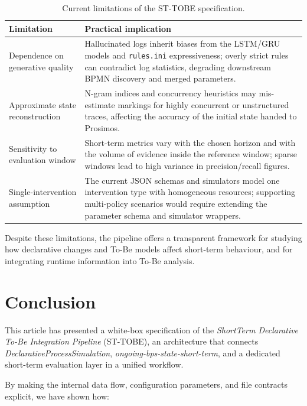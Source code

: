 \documentclass[a4paper,fleqn]{cas-sc}
\begin{document}
\begin{table}[width=.95\linewidth,cols=2,pos=t]
\caption{Current limitations of the ST-TOBE specification.}
\label{tbl:limitations}
\begin{tabular*}{\tblwidth}{@{} p{} p{} @{}}
\toprule
Limitation & Practical implication \\
\midrule
Dependence on generative quality & Hallucinated logs inherit biases from the LSTM/GRU models and \verb|rules.ini| expressiveness; overly strict rules can contradict log statistics, degrading downstream BPMN discovery and merged parameters. \\
Approximate state reconstruction & N-gram indices and concurrency heuristics \citep{ChapelaCampa2025TSC} may mis-estimate markings for highly concurrent or unstructured traces, affecting the accuracy of the initial state handed to Prosimos. \\
Sensitivity to evaluation window & Short-term metrics vary with the chosen horizon and with the volume of evidence inside the reference window; sparse windows lead to high variance in precision/recall figures. \\
Single-intervention assumption & The current JSON schemas and simulators model one intervention type with homogeneous resources; supporting multi-policy scenarios would require extending the parameter schema and simulator wrappers. \\
\bottomrule
\end{tabular*}
\end{table}

Despite these limitations, the pipeline offers a transparent
framework for studying how declarative changes and To-Be models
affect short-term behaviour, and for integrating runtime
information into To-Be analysis.

\section{Conclusion}
\label{sec:conclusion}

This article has presented a white-box specification of the
\emph{ShortTerm Declarative To-Be Integration Pipeline}
(ST-TOBE), an architecture that connects
\emph{DeclarativeProcessSimulation},
\emph{ongoing-bps-state-short-term}, and a dedicated
short-term evaluation layer in a unified workflow.

By making the internal data flow, configuration parameters,
and file contracts explicit, we have shown how:
\end{document}
